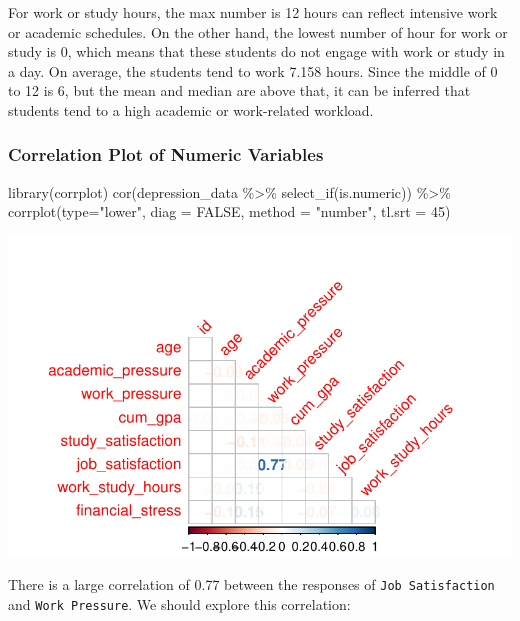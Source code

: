 \documentclass[
  letterpaper,
  DIV=11,
  numbers=noendperiod]{scrartcl}
\newenvironment{Shaded}{\begin{snugshade}}{\end{snugshade}}
\newcommand{\AttributeTok}[1]{\textcolor[rgb]{0.40,0.45,0.13}{#1}}
\newcommand{\ConstantTok}[1]{\textcolor[rgb]{0.56,0.35,0.01}{#1}}
\newcommand{\DecValTok}[1]{\textcolor[rgb]{0.68,0.00,0.00}{#1}}
\newcommand{\FunctionTok}[1]{\textcolor[rgb]{0.28,0.35,0.67}{#1}}
\newcommand{\NormalTok}[1]{\textcolor[rgb]{0.00,0.23,0.31}{#1}}
\newcommand{\SpecialCharTok}[1]{\textcolor[rgb]{0.37,0.37,0.37}{#1}}
\newcommand{\StringTok}[1]{\textcolor[rgb]{0.13,0.47,0.30}{#1}}
\begin{document}
For work or study hours, the max number is 12 hours can reflect
intensive work or academic schedules. On the other hand, the lowest
number of hour for work or study is 0, which means that these students
do not engage with work or study in a day. On average, the students tend
to work 7.158 hours. Since the middle of 0 to 12 is 6, but the mean and
median are above that, it can be inferred that students tend to a high
academic or work-related workload.

\subsubsection{Correlation Plot of Numeric
Variables}\label{correlation-plot-of-numeric-variables}

\begin{Shaded}
\begin{Highlighting}[numbers=left,,]
\FunctionTok{library}\NormalTok{(corrplot)}
\FunctionTok{cor}\NormalTok{(depression\_data }\SpecialCharTok{\%\textgreater{}\%} 
      \FunctionTok{select\_if}\NormalTok{(is.numeric)) }\SpecialCharTok{\%\textgreater{}\%} 
  \FunctionTok{corrplot}\NormalTok{(}\AttributeTok{type=}\StringTok{"lower"}\NormalTok{, }\AttributeTok{diag =} \ConstantTok{FALSE}\NormalTok{, }\AttributeTok{method =} \StringTok{"number"}\NormalTok{, }\AttributeTok{tl.srt =} \DecValTok{45}\NormalTok{)}
\end{Highlighting}
\end{Shaded}

\includegraphics{Final_Project-Step-2_files/figure-pdf/unnamed-chunk-20-1.pdf}

There is a large correlation of 0.77 between the responses of
\texttt{Job\ Satisfaction} and \texttt{Work\ Pressure}. We should
explore this correlation:
\end{document}

